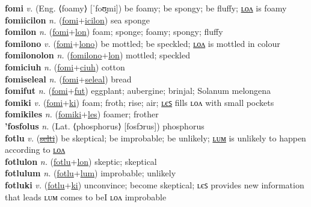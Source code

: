 \textbf{fomi} \textit{v.} (Eng. ⟨foamy⟩ [ˈfoʊ̯mi])
be foamy; be spongy; be fluffy; \hyperref[fomilon]{ʟᴏᴧ} is foamy \label{fomi} \\
\textbf{fomiicilon} \textit{n.} (\hyperref[fomi]{fomi}+\hyperref[icilon]{icilon})
sea sponge \label{fomiicilon} \\
\textbf{fomilon} \textit{n.} (\hyperref[fomi]{fomi}+\hyperref[lon]{lon})
foam; sponge; foamy; spongy; fluffy \label{fomilon} \\
\textbf{fomilono} \textit{v.} (\hyperref[fomi]{fomi}+\hyperref[lono]{lono})
be mottled; be speckled; \hyperref[fomilonolon]{ʟᴏᴧ} is mottled in colour \label{fomilono} \\
\textbf{fomilonolon} \textit{n.} (\hyperref[fomilono]{fomilono}+\hyperref[lon]{lon})
mottled; speckled \label{fomilonolon} \\
\textbf{fomiciuh} \textit{n.} (\hyperref[fomi]{fomi}+\hyperref[ciuh]{ciuh})
cotton \label{fomiciuh} \\
\textbf{fomiseleal} \textit{n.} (\hyperref[fomi]{fomi}+\hyperref[seleal]{seleal})
bread \label{fomiseleal} \\
\textbf{fomifut} \textit{n.} (\hyperref[fomi]{fomi}+\hyperref[fut]{fut})
eggplant; aubergine; brinjal; Solanum melongena \label{fomifut} \\
\textbf{fomiki} \textit{v.} (\hyperref[fomi]{fomi}+\hyperref[ki]{ki})
foam; froth; rise; air; \hyperref[fomikiles]{ʟєꜱ} fills ʟᴏᴧ with small pockets \label{fomiki} \\
\textbf{fomikiles} \textit{n.} (\hyperref[fomiki]{fomiki}+\hyperref[les]{les})
foamer; frother \label{fomikiles} \\
\textbf{'fosfolus} \textit{n.} (Lat. ⟨phosphorus⟩ [fosfɔrus])
phosphorus \label{'fosfolus} \\
\textbf{fotlu} \textit{v.} (\hyperref[selti]{\sout{selti}})
be skeptical; be improbable; be unlikely; \hyperref[fotlulum]{ʟᴜᴍ} is unlikely to happen according to \hyperref[fotlulon]{ʟᴏᴧ} \label{fotlu} \\
\textbf{fotlulon} \textit{n.} (\hyperref[fotlu]{fotlu}+\hyperref[lon]{lon})
skeptic; skeptical \label{fotlulon} \\
\textbf{fotlulum} \textit{n.} (\hyperref[fotlu]{fotlu}+\hyperref[lum]{lum})
improbable; unlikely \label{fotlulum} \\
\textbf{fotluki} \textit{v.} (\hyperref[fotlu]{fotlu}+\hyperref[ki]{ki})
unconvince; become skeptical; ʟєꜱ provides new information that leads ʟᴜᴍ comes to beI ʟᴏᴧ improbable \label{fotluki} \\
